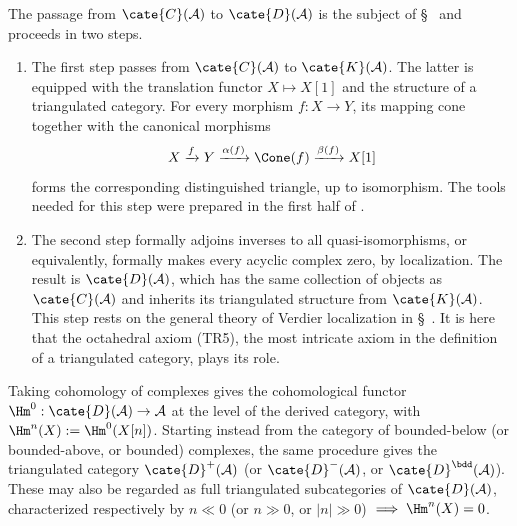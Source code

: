 The passage from $\cate{C}(\mathcal{A})$ to $\cate{D}(\mathcal{A})$ is the
subject of \S~ and proceeds in two
steps.
\begin{enumerate}
	\item The first step passes from $\cate{C}(\mathcal{A})$ to
	$\cate{K}(\mathcal{A})$. The latter is equipped with the translation
	functor $X\mapsto X[1]$ and the structure of a triangulated category. For
	every morphism $f:X\to Y$, its mapping cone together with the canonical
	morphisms
	\[
	  X \xrightarrow{f} Y \xrightarrow{\alpha(f)} \Cone(f)
	  \xrightarrow{\beta(f)} X[1]
	\]
	forms the corresponding distinguished triangle, up to isomorphism. The
	tools needed for this step were prepared in the first half of
	.
	\item The second step formally adjoins inverses to all
	quasi-isomorphisms, or equivalently, formally makes every acyclic complex
	zero, by localization. The result is $\cate{D}(\mathcal{A})$, which has
	the same collection of objects as $\cate{C}(\mathcal{A})$ and inherits
	its triangulated structure from $\cate{K}(\mathcal{A})$. This step rests
	on the general theory of Verdier localization in
	\S~. It is here that
	the octahedral axiom (TR5), the most intricate axiom in the definition of
	a triangulated category, plays its role.
\end{enumerate}

Taking cohomology of complexes gives the cohomological functor
$\Hm^0:\cate{D}(\mathcal{A})\to\mathcal{A}$ at the level of the derived
category, with $\Hm^n(X):=\Hm^0(X[n])$. Starting instead from the category
of bounded-below (or bounded-above, or bounded) complexes, the same procedure
gives the triangulated category $\cate{D}^+(\mathcal{A})$ (or
$\cate{D}^-(\mathcal{A})$, or $\cate{D}^{\bdd}(\mathcal{A})$). These may
also be regarded as full triangulated subcategories of
$\cate{D}(\mathcal{A})$, characterized respectively by
$n\ll0$ (or $n\gg0$, or $|n|\gg0$) $\implies\Hm^n(X)=0$.

